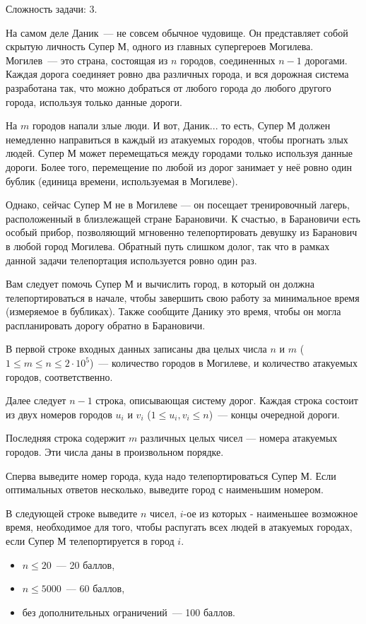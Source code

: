 
\Legend
Сложность задачи: $3$.

На самом деле Даник~--- не совсем обычное чудовище. Он представляет собой скрытую личность Супер М, одного из главных супергероев Могилева. Могилев~--- это страна, состоящая из $n$ городов, соединенных $n - 1$ дорогами. Каждая дорога соединяет ровно два различных города, и вся дорожная система разработана так, что можно добраться от любого города до любого другого города, используя только данные дороги.

На $m$ городов напали злые люди. И вот, Даник... то есть, Супер М должен немедленно направиться в каждый из атакуемых городов, чтобы прогнать злых людей. Супер М может перемещаться между городами только используя данные дороги. Более того, перемещение по любой из дорог занимает у неё ровно один бублик (единица времени, используемая в Могилеве).

Однако, сейчас Супер М не в Могилеве — он посещает тренировочный лагерь, расположенный в близлежащей стране Барановичи. К счастью, в Барановичи есть особый прибор, позволяющий мгновенно телепортировать девушку из Баранович в любой город Могилева. Обратный путь слишком долог, так что в рамках данной задачи телепортация используется ровно один раз.

Вам следует помочь Супер М и вычислить город, в который он должна телепортироваться в начале, чтобы завершить свою работу за минимальное время (измеряемое в бубликах). Также сообщите Данику это время, чтобы он могла распланировать дорогу обратно в Барановичи.

\Input

В первой строке входных данных записаны два целых числа $n$ и $m$ ($1 \le m \le n \le 2 \cdot 10^5$)~--- количество городов в Могилеве, и количество атакуемых городов, соответственно.

Далее следует $n - 1$ строка, описывающая систему дорог. Каждая строка состоит из двух номеров городов $u_i$ и $v_i$ ($1 \le u_i, v_i \le n$)~--- концы очередной дороги.

Последняя строка содержит $m$ различных целых чисел — номера атакуемых городов. Эти числа даны в произвольном порядке.

\Output

Сперва выведите номер города, куда надо телепортироваться Супер М. Если оптимальных ответов несколько, выведите город с наименьшим номером.

В следующей строке выведите $n$ чисел, $i$-ое из которых - наименьшее возможное время, необходимое для того, чтобы распугать всех людей в атакуемых городах, если Супер М телепортируется в город $i$.

\Samples
\BeginTests
\EndTests

\Scoring
\begin{itemize}
	\item $n \le 20$~--- 20 баллов,
	\item $n \le 5000$~--- 60 баллов,
	\item без дополнительных ограничений~--- 100 баллов.
\end{itemize}

\EndProblem
